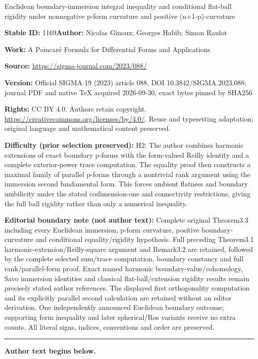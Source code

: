 \documentclass[11pt]{article}
\numberwithin{equation}{section}
\numberwithin{equation}{section}
\begin{document}
\begin{center}\Large Euclidean boundary-immersion integral inequality and conditional flat-ball rigidity under nonnegative p-form curvature and positive (n+1-p)-curvature\end{center}
\noindent\textbf{Stable ID:} 1169\quad\textbf{Author:} Nicolas Ginoux; Georges Habib; Simon Raulot\par
\noindent\textbf{Work:} A Poincar\'e Formula for Differential Forms and Applications\par
\noindent\textbf{Source:} \url{https://sigma-journal.com/2023/088/}\par
\noindent\textbf{Version:} Official SIGMA 19 (2023) article 088, DOI 10.3842/SIGMA.2023.088; journal PDF and native TeX acquired 2026-09-30, exact bytes pinned by SHA256\par
\noindent\textbf{Rights:} CC BY 4.0. Authors retain copyright. \url{https://creativecommons.org/licenses/by/4.0/}. Reuse and typesetting adaptation; original language and mathematical content preserved.\par
\noindent\textbf{Difficulty (prior selection preserved):} {\CJKfont H2: The author combines harmonic extensions of exact boundary p-forms with the form-valued Reilly identity and a complete exterior-power trace computation. The equality proof then constructs a maximal family of parallel p-forms through a nontrivial rank argument using the immersion second fundamental form. This forces ambient flatness and boundary umbilicity under the stated codimension-one and connectivity restrictions, giving the full ball rigidity rather than only a numerical inequality.}\par
\medskip\noindent\textbf{Editorial boundary note (not author text):} Complete original Theorem3.3 including every Euclidean immersion, p-form curvature, positive boundary-curvature and conditional equality/rigidity hypothesis. Full preceding Theorem3.1 harmonic-extension/Reilly-square argument and Remark3.2 are retained, followed by the complete selected sum/trace computation, boundary constancy and full rank/parallel-form proof. Exact named harmonic boundary-value/cohomology, Savo immersion identities and classical flat-ball/extension rigidity results remain precisely stated author references. The displayed first orthogonality computation and its explicitly parallel second calculation are retained without an editor derivation. One independently announced Euclidean boundary outcome; supporting form inequality and later spherical/Ros variants receive no extra counts. All literal signs, indices, conventions and order are preserved.\par
\medskip\hrule\medskip\noindent\textbf{Author text begins below.}\par
\setcounter{section}{1}
\end{document}
